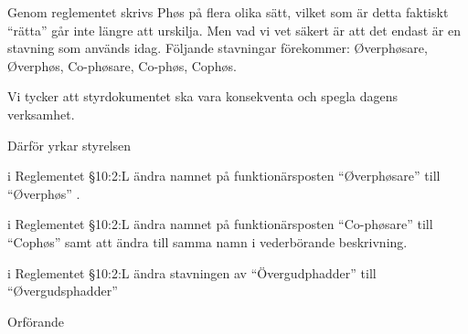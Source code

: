 \documentclass[../_main/handlingar.tex]{subfiles}
\begin{document}

Genom reglementet skrivs Phøs på flera olika sätt, vilket som är detta faktiskt “rätta” går inte längre att urskilja. Men vad vi vet säkert är att det endast är en stavning som används idag. Följande stavningar förekommer: Øverphøsare, Øverphøs, Co-phøsare, Co-phøs, Cophøs. 

Vi tycker att styrdokumentet ska vara konsekventa och spegla dagens verksamhet. 

Därför yrkar styrelsen

\begin{attsatser}
    \att i Reglementet \S10:2:L ändra namnet på funktionärsposten “Øverphøsare” till “Øverphøs” .

    \att i Reglementet \S10:2:L ändra namnet på funktionärsposten  “Co-phøsare” till “Cophøs” samt att ändra till samma namn i vederbörande beskrivning. 

    \att i Reglementet \S10:2:L ändra stavningen av “Övergudphadder” till “Øvergudsphadder”


\end{attsatser}

\begin{signatures}{1}
    \ist
    \signature{\ordf}{Orförande}
\end{signatures}
\end{document}

